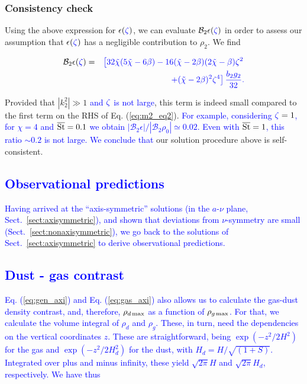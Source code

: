 \documentclass[apj]{emulateapj}
\def\blue#1{\textcolor{blue}{ #1}}
\newcommand{\Eq}[1]{Eq. (\ref{#1})}
\newcommand{\eq}[1]{\Eq{#1}}
\newcommand{\sect}[1]{Sect.~\ref{#1}}
\newcommand{\beqn}{\begin{eqnarray}}
\newcommand{\eeqn}{\end{eqnarray}}
\newcommand{\tilchi}{\tilde\chi}
\newcommand{\St}{{\rm St}}
\begin{document}
\subsubsection{Consistency check}
Using the above expression for $\epsilon(\blue{\zeta})$, we can evaluate
$\mathcal{B}_2\epsilon(\blue{\zeta})$ in order to assess our assumption that
$\epsilon(\blue{\zeta})$ has a negligible contribution to $\rho_2$. We find

\beqn
\mathcal{B}_2\epsilon(\blue{\zeta}) =&& \blue{\left[32\tilchi(5\tilchi - 6\beta)-16(\tilchi-2\beta)(2\tilchi-\beta)\blue{\zeta}^2
\right.\notag}\\&&\blue{\left.+(\tilchi - 2\beta)^2\blue{\zeta}^4\right]\frac{b_2g_2}{32}.}
\eeqn

Provided that $|k_2^2|\gg1$ \blue{and $\blue{\zeta}$ is not large},  
this term is indeed small compared to the first term on the RHS of \eq{eq:m2_eq2}.  \blue{For example, considering $\blue{\zeta}=1$, 
for $\chi=4$ and $\overline{\St}=0.1$ we obtain $|\mathcal{B}_2\epsilon|/|\mathcal{B}_2\rho_0|\simeq0.02$. 
Even with $\overline{\St}=1$, this ratio $\sim0.2$ is not large. We
conclude that}  our solution procedure above is self-consistent.

\blue{\section{Observational predictions}}

\blue{Having arrived at the ``axis-symmetric'' solutions (in the
  $a$-$\nu$ plane, \sect{sect:axisymmetric}), and shown that deviations from
  $\nu$-symmetry are small (\sect{sect:nonaxisymmetric}), we go back to
  the solutions of \sect{sect:axisymmetric} to derive observational predictions.}

\blue{\subsection{Dust - gas contrast}}

\blue{\eq{eq:gen_axi} and \eq{eq:gas_axi} also allows us to calculate the gas-dust
density contrast, and, therefore, $\rho_{d\,{\rm max}}$ as a function of
$\rho_{g\,{\rm max}}$. For that, we calculate the volume integral of $\rho_d$
and $\rho_g$. These, in turn, need the dependencies on the vertical
coordinates $z$. These are straightforward, being $\exp(-z^2/2H^2)$ for the gas and
$\exp(-z^2/2H_d^2)$ for the dust, with $H_d=H/\sqrt{(1+S)}$. Integrated
over plus and minus infinity, these yield $\sqrt{2\pi}H$ and
$\sqrt{2\pi}H_d$, respectively. We have thus}
\end{document}

